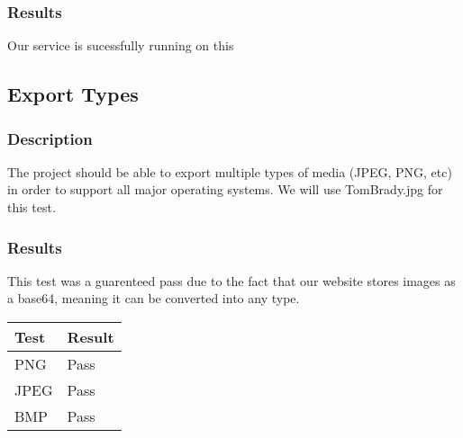 \documentclass{scrreprt}
\begin{document}
\subsubsection{Results}
\begin{flushleft}
Our service is sucessfully running on this
\end{flushleft}

\subsection{Export Types}
\subsubsection{Description}
\begin{flushleft}
The project should be able to export multiple types of media (JPEG, PNG, etc) in order to support all major operating systems. We will use TomBrady.jpg for this test.
\end{flushleft}
\subsubsection{Results}
\begin{flushleft}
This test was a guarenteed pass due to the fact that our website stores images as a base64, meaning it can be converted into any type.
\end{flushleft}
 \centering
 \begin{tabular}{||p{2.5cm}|p{2.5cm}||}
 \hline
 \textbf Test & \textbf Result\\
 \hline\hline
  PNG & Pass \\ %
 \hline
 JPEG & Pass \\ %
 \hline
 BMP & Pass \\ %
 \hline
 \end{tabular}
\end{document}
